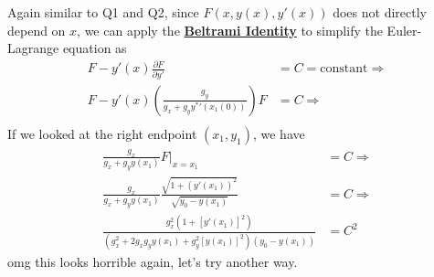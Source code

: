 \documentclass[conference,onecolumn]{IEEEtran}
\begin{document}
\begin{enumerate}
            Again similar to Q1 and Q2, since $F(x, y(x), y'(x))$ does not directly depend on $x$, we can apply the \textbf{\href{https://en.wikipedia.org/wiki/Beltrami_identity}{Beltrami Identity}} to simplify the Euler-Lagrange equation as
            \begin{align*}
                  F - y'(x) \frac{\partial F}{\partial y'}                       & = C = \text{constant} \Rightarrow \\
                  F - y'(x) \left(\frac{g_y}{g_x + g_y {y^*}'(x_1(0))} \right) F & = C \Rightarrow                   \\
            \end{align*}
            If we looked at the right endpoint $(x_1, y_1)$, we have
            \begin{align*}
                  \frac{g_x}{g_x + g_y y(x_1)} F \bigg|_{x = x_1}                                             & = C \Rightarrow \\
                  \frac{g_x}{g_x + g_y y(x_1)} \frac{\sqrt{1 + (y'(x_1))^2}}{\sqrt{y_0 - y(x_1)}}             & = C \Rightarrow \\
                  \frac{g_x^2 (1 + [y'(x_1)]^2)}{(g_x^2 + 2 g_x g_y y(x_1) + g_y^2 [y(x_1)]^2)(y_0 - y(x_1))} & = C^2
            \end{align*}
            omg this looks horrible again, let's try another way.


\end{enumerate}
\end{document}
